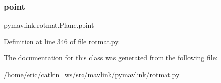 \subsubsection{\texorpdfstring{point}{point}}
{\footnotesize\ttfamily pymavlink.\+rotmat.\+Plane.\+point}



Definition at line 346 of file rotmat.\+py.



The documentation for this class was generated from the following file\+:\begin{DoxyCompactItemize}
\item 
/home/eric/catkin\+\_\+ws/src/mavlink/pymavlink/\mbox{\hyperlink{rotmat_8py}{rotmat.\+py}}\end{DoxyCompactItemize}
